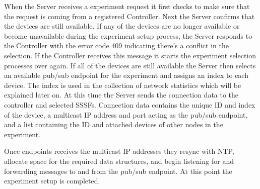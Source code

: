 \documentclass[letterpaper,twocolumn,12pt]{article}
\begin{document}
When the Server receives a experiment request it first checks to make sure that the request is coming from a registered Controller. 
Next the Server confirms that the devices are still available. 
If any of the devices are no longer available or become unavailable during the experiment setup process, the Server responds to the Controller with the error code 409 indicating there's a conflict in the selection. 
If the Controller receives this message it starts the experiment selection processes over again. 
If all of the devices are still available the Server then selects an available pub/sub endpoint for the experiment and assigns an index to each device. The index is used in the collection of network statistics which will be explained later on. 
At this time the Server sends the connection data to the controller and selected SSSFs. Connection data contains the unique ID and index of the device, a multicast IP address and port acting as the pub/sub endpoint, and a list containing the ID and attached devices of other nodes in the experiment.

Once endpoints receives the multicast IP addresses they resync with NTP, allocate space for the required data structures, and begin listening for and forwarding messages to and from the pub/sub endpoint. At this point the experiment setup is completed.
\end{document}
